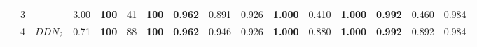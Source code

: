 \begin{table}[tph]
\begin{adjustbox}{angle=90}
{\begin{tabular}{c|c|cc|ccc|ccc|ccc|ccc}
                \\
                                                                        & 3
                                                                        &
                                                                        & 3.00                           &
                \textbf{100}
                                                                        & 41
                                                                        &
                \textbf{100}
                                                                        &
                \textbf{0.962}
                                                                        & 0.891
                                                                        & 0.926                          &
                \textbf{1.000}
                                                                        & 0.410
                                                                        &
                \textbf{1.000}
                                                                        &
                \textbf{0.992}
                                                                        & 0.460
                                                                        & 0.984
                \\
                                                                        & 4
                                                                        & $DDN_{2}$                      & 0.71
                                                                        &
                \textbf{100}
                                                                        & 88
                                                                        &
                \textbf{100}
                                                                        &
                \textbf{0.962}
                                                                        & 0.946
                                                                        & 0.926                          &
                \textbf{1.000}
                                                                        & 0.880
                                                                        &
                \textbf{1.000}
                                                                        &
                \textbf{0.992}
                                                                        & 0.892
                                                                        & 0.984

\end{tabular}}
\end{adjustbox}
\end{table}
